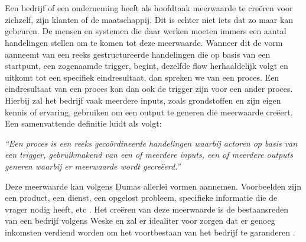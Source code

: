 
\chapter{}%
\label{ch:literatuurstudie}
\section{}%
\label{sec:processen en governance}
Een bedrijf of een onderneming heeft als hoofdtaak meerwaarde te creëren voor zichzelf, zijn klanten of de maatschappij. Dit is echter niet iets dat zo maar kan gebeuren. De mensen en systemen die daar werken moeten immers een aantal handelingen stellen om te komen tot deze meerwaarde. Wanneer dit de vorm aanneemt van een reeks gestructureerde handelingen die op basis van een startpunt, een zogenaamde trigger, begint, dezelfde flow herhaaldelijk volgt en uitkomt tot een specifiek eindresultaat, dan spreken we van een proces. Een eindresultaat van een proces kan dan ook de trigger zijn voor een ander proces. Hierbij zal het bedrijf vaak meerdere inputs, zoals grondstoffen en zijn eigen kennis of ervaring, gebruiken om een output te generen die meerwaarde creëert. Een samenvattende definitie luidt als volgt:
\begin{center}
\textit{“Een proces is een reeks gecoördineerde handelingen waarbij actoren op basis van een trigger, gebruikmakend van een of meerdere inputs, een of meerdere outputs generen waarbij er meerwaarde wordt gecreëerd.”}
\end{center}\newline

Deze meerwaarde kan volgens Dumas allerlei vormen aannemen. Voorbeelden zijn een product, een dienst, een opgelost probleem, specifieke informatie die de vrager nodig heeft, etc \autocite[p. 4]{Dumas2018}. Het creëren van deze meerwaarde is de bestaansreden van een bedrijf volgens Weske en zal er idealiter voor zorgen dat er genoeg inkomsten verdiend worden om het voortbestaan van het bedrijf te garanderen \autocite[p. 5]{Weske2019}. \newline

